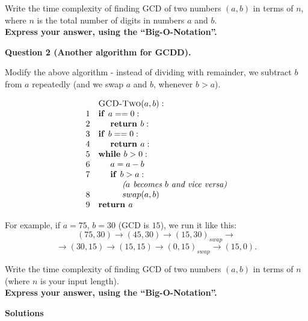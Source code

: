 \documentclass[a4paper,12pt]{article}
\begin{document}
Write the time complexity of finding GCD of two numbers $(a,b)$ in terms of $n$, 
where $n$ is the total number of digits in numbers $a$ and $b$.\\
{\bf Express your answer, using the ``Big-O-Notation''.}



\vspace{20pt}
{\bf Question 2 (Another algorithm for GCDD).} 

Modify the above algorithm - instead of dividing with remainder, we subtract $b$ from $a$ 
repeatedly (and we swap $a$ and $b$, whenever $b > a$). 

\[
\begin{array}{rl}
 & \text{\textsc{GCD-Two}}(a,b):\\
1 & \text{\textbf{if\ }} a == 0:\\
2 & \hspace{.5cm} \text{\textbf{return\ }} b:\\
3 & \text{\textbf{if\ }} b == 0:\\
4 & \hspace{.5cm} \text{\textbf{return\ }} a:\\
5 & \text{\textbf{while\ }} b > 0:\\
6 & \hspace{.5cm} a = a - b\\
7 & \hspace{.5cm} \text{\textbf{if\ }} b > a:\\
  & \hspace{1.0cm} \text{\em ($a$ becomes $b$ and vice versa)}\\
8 & \hspace{1.0cm} swap(a,b)\\
9 & \text{\textbf{return\ }} a\\
\end{array}
\]

For example, if $a = 75$, $b = 30$ (GCD is $15$), we run it like this:
{\small
$$(75,30) \rightarrow (45,30) \rightarrow (15,30)_{swap} \rightarrow$$
$$ \rightarrow (30,15) \rightarrow (15,15) \rightarrow
(0,15)_{swap} \rightarrow (15,0).$$
}

Write the time complexity of finding GCD of two numbers $(a,b)$ in terms of $n$
(where $n$ is your input length).\\
{\bf Express your answer, using the ``Big-O-Notation''.}




\newpage

{\bf \large Solutions}
\end{document}
